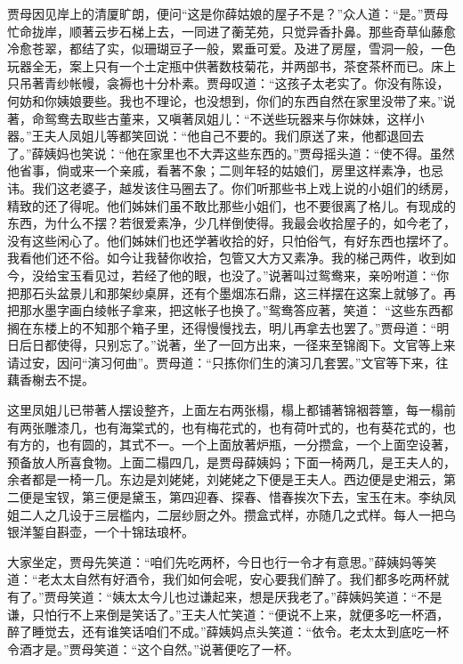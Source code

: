 \begin{parag}
    贾母因见岸上的清厦旷朗，便问“这是你薛姑娘的屋子不是？”众人道：“是。”贾母忙命拢岸，顺著云步石梯上去，一同进了蘅芜苑，只觉异香扑鼻。那些奇草仙藤愈冷愈苍翠，都结了实，似珊瑚豆子一般，累垂可爱。及进了房屋，雪洞一般，一色玩器全无，案上只有一个土定瓶中供著数枝菊花，并两部书，茶奁茶杯而已。床上只吊著青纱帐幔，衾褥也十分朴素。贾母叹道：“这孩子太老实了。你没有陈设，何妨和你姨娘要些。我也不理论，也没想到，你们的东西自然在家里没带了来。”说著，命鸳鸯去取些古董来，又嗔著凤姐儿：“不送些玩器来与你妹妹，这样小器。”王夫人凤姐儿等都笑回说：“他自己不要的。我们原送了来，他都退回去了。”薛姨妈也笑说：“他在家里也不大弄这些东西的。”贾母摇头道：“使不得。虽然他省事，倘或来一个亲戚，看著不象；二则年轻的姑娘们，房里这样素净，也忌讳。我们这老婆子，越发该住马圈去了。你们听那些书上戏上说的小姐们的绣房，精致的还了得呢。他们姊妹们虽不敢比那些小姐们，也不要很离了格儿。有现成的东西，为什么不摆？若很爱素净，少几样倒使得。我最会收拾屋子的，如今老了，没有这些闲心了。他们姊妹们也还学著收拾的好，只怕俗气，有好东西也摆坏了。我看他们还不俗。如今让我替你收拾，包管又大方又素净。我的梯己两件，收到如今，没给宝玉看见过，若经了他的眼，也没了。”说著叫过鸳鸯来，亲吩咐道：“你把那石头盆景儿和那架纱桌屏，还有个墨烟冻石鼎，这三样摆在这案上就够了。再把那水墨字画白绫帐子拿来，把这帐子也换了。”鸳鸯答应著，笑道： “这些东西都搁在东楼上的不知那个箱子里，还得慢慢找去，明儿再拿去也罢了。”贾母道：“明日后日都使得，只别忘了。”说著，坐了一回方出来，一径来至锦阁下。文官等上来请过安，因问“演习何曲”。贾母道：“只拣你们生的演习几套罢。”文官等下来，往藕香榭去不提。
\end{parag}


\begin{parag}
    这里凤姐儿已带著人摆设整齐，上面左右两张榻，榻上都铺著锦裀蓉簟，每一榻前有两张雕漆几，也有海棠式的，也有梅花式的，也有荷叶式的，也有葵花式的，也有方的，也有圆的，其式不一。一个上面放著炉瓶，一分攒盒，一个上面空设著，预备放人所喜食物。上面二榻四几，是贾母薛姨妈；下面一椅两几，是王夫人的，余者都是一椅一几。东边是刘姥姥，刘姥姥之下便是王夫人。西边便是史湘云，第二便是宝钗，第三便是黛玉，第四迎春、探春、惜春挨次下去，宝玉在末。李纨凤姐二人之几设于三层槛内，二层纱厨之外。攒盒式样，亦随几之式样。每人一把乌银洋錾自斟壶，一个十锦珐琅杯。
\end{parag}


\begin{parag}
    大家坐定，贾母先笑道：“咱们先吃两杯，今日也行一令才有意思。”薛姨妈等笑道：“老太太自然有好酒令，我们如何会呢，安心要我们醉了。我们都多吃两杯就有了。”贾母笑道：“姨太太今儿也过谦起来，想是厌我老了。”薛姨妈笑道：“不是谦，只怕行不上来倒是笑话了。”王夫人忙笑道：“便说不上来，就便多吃一杯酒，醉了睡觉去，还有谁笑话咱们不成。”薛姨妈点头笑道：“依令。老太太到底吃一杯令酒才是。”贾母笑道：“这个自然。”说著便吃了一杯。
\end{parag}


